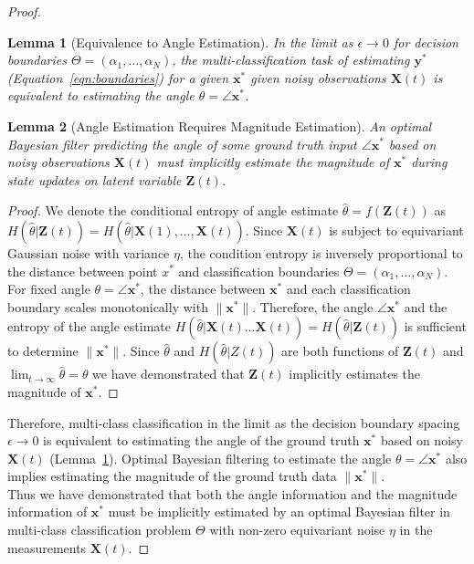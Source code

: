 \documentclass[12pt]{article}
\newtheorem{lemma}{Lemma}
\begin{document}
\begin{proof}
	\begin{lemma}[Equivalence to Angle Estimation]
		\label{lemma:angle_equiv}
		In the limit as $\epsilon \to 0$ for decision boundaries $\Theta =
		(\alpha_1, \dots, \alpha_N)$, the multi-classification task of
		estimating $\mathbf y^*$ (Equation~\ref{eqn:boundaries}) for a given
		$\mathbf x^*$ given noisy observations $\mathbf X(t)$ is equivalent to
		estimating the angle $\theta = \angle \mathbf x^*$. 
	\end{lemma}


	\begin{lemma}[Angle Estimation Requires Magnitude Estimation]
		\label{lemma:angle_to_magnitude}
		An optimal Bayesian filter predicting the angle of some ground truth
		input $\angle \mathbf x^*$ based on noisy observations $\mathbf X(t)$
		must implicitly estimate the magnitude of $\mathbf x^*$ during state
		updates on latent variable $\mathbf Z(t)$. 
	\end{lemma}
	\begin{proof}
		We denote the conditional entropy of angle estimate $\hat \theta =
		f(\mathbf Z(t))$ as $H(\hat \theta | \mathbf Z(t))=  H(\hat \theta |
		\mathbf X(1), \dots, \mathbf X(t))$.
		Since $\mathbf X(t)$ is subject to equivariant Gaussian noise with
		variance $\eta$, the condition entropy is inversely proportional to the
		distance between point $x^*$ and classification boundaries $\Theta =
		(\alpha_1, \dots, \alpha_N)$.  
		For fixed angle $\theta = \angle \mathbf x^*$, the distance between
		$\mathbf x^*$ and each classification boundary scales monotonically
		with $\|\mathbf x^*\|$. 
		Therefore, the angle $\angle \mathbf x^*$ and the entropy of the angle
		estimate $H(\hat \theta | \mathbf X(t) \dots \mathbf X(t)) = H(\hat
		\theta | \mathbf Z(t))$ is sufficient to determine $\|\mathbf x^*\|$. 
		Since $\hat \theta$ and $H(\hat \theta | Z(t))$ are both functions of
		$\mathbf Z(t)$ and $\lim_{t\to\infty}\hat \theta = \theta$ we have demonstrated that
		$\mathbf Z(t)$ implicitly estimates the magnitude of $\mathbf x^*$.
	\end{proof}

	Therefore, multi-class classification in the limit as the decision boundary
	spacing $\epsilon \to 0$ is equivalent to estimating the angle of the
	ground truth $\mathbf x^*$ based on noisy $\mathbf X(t)$
	(Lemma~\ref{lemma:angle_equiv}).
	Optimal Bayesian filtering to estimate the angle $\theta = \angle \mathbf
	x^*$ also implies estimating the magnitude of the ground truth data
	$\|\mathbf x^*\|$. \\


	Thus we have demonstrated that both the angle information and the magnitude
	information of $\mathbf x^*$ must be implicitly estimated by an optimal
	Bayesian filter in multi-class classification problem $\Theta$ with
	non-zero equivariant noise $\eta$ in the measurements $\mathbf X(t)$. 
\end{proof}
\end{document}
